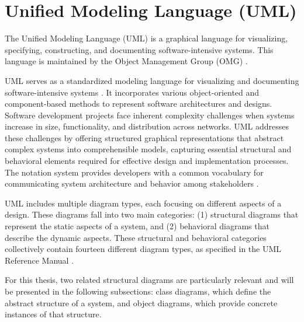 \section{Unified Modeling Language (UML)}

\hspace{1cm} The Unified Modeling Language (UML) is a graphical language for 
visualizing, specifying, constructing, and documenting software-intensive systems. 
This language is maintained by the Object Management Group (OMG) \cite{UML}.

UML serves as a standardized modeling language for visualizing and documenting 
software-intensive systems \cite{UML}. It incorporates various object-oriented 
and component-based methods to represent software architectures and designs. 
Software development projects face inherent complexity challenges when systems 
increase in size, functionality, and distribution across networks. UML addresses 
these challenges by offering structured graphical representations that abstract 
complex systems into comprehensible models, capturing essential structural and 
behavioral elements required for effective design and implementation processes. 
The notation system provides developers with a common vocabulary for communicating 
system architecture and behavior among stakeholders \cite{UML_Reference_Manual}.

UML includes multiple diagram types, each focusing on different aspects of a design. 
These diagrams fall into two main categories: (1) structural diagrams that represent 
the static aspects of a system, and (2) behavioral diagrams that describe the dynamic 
aspects. These structural and behavioral categories collectively contain fourteen 
different diagram types, as specified in the UML Reference Manual \cite{UML_Reference_Manual}.

For this thesis, two related structural diagrams are particularly relevant and will be presented in the following subsections: class diagrams, which define the abstract structure of a system, and object diagrams, which provide concrete instances of that structure.


